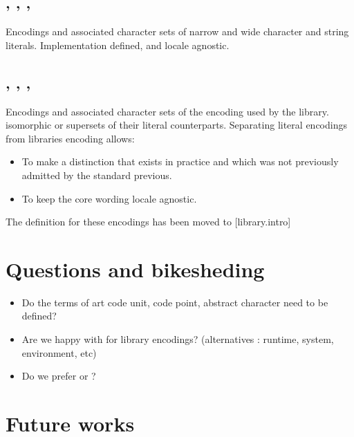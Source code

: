 \documentclass{wg21}
\begin{document}
\subsection{, , , }

Encodings and associated character sets of narrow and wide character and string literals. Implementation defined, and locale agnostic.



\subsection{, , , }

Encodings and associated character sets of the encoding used by the library. isomorphic or supersets of their literal counterparts.
Separating literal encodings from libraries encoding allows:

\begin{itemize}
    \item To make a distinction that exists in practice and which was not previously admitted by the standard previous.
    \item To keep the core wording locale agnostic.
\end{itemize}

The definition for these encodings has been moved to [library.intro]

\section{Questions and bikesheding}

\begin{itemize}
    \item Do the terms of art code unit, code point, abstract character need to be defined?
    \item Are we happy with  for library encodings? (alternatives : runtime, system, environment, etc)
    \item Do we prefer  or  ?
\end{itemize}




\section{Future works}
\end{document}
